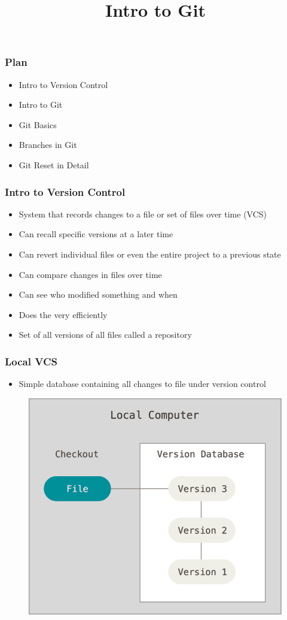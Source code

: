 \documentclass{beamer}
\title{Intro to Git}
\date{}
\begin{document}
\frame{\titlepage}

\begin{frame}
	\frametitle{Plan}
	\begin{itemize}
		\item{Intro to Version Control}
		\item{Intro to Git}
		\item{Git Basics}
		\item{Branches in Git}
		\item{Git Reset in Detail}
	\end{itemize}
\end{frame}

\begin{frame}
	\frametitle{Intro to Version Control}
	\begin{itemize}
		\item{System that records changes to a file or set of files over time (VCS)}
		\item{Can recall specific versions at a later time}
		\item{Can revert individual files or even the entire project to a previous state}
		\item{Can compare changes in files over time}
		\item{Can see who modified something and when}
		\item{Does the very efficiently}
		\item{Set of all versions of all files called a repository}
	\end{itemize}
\end{frame}

\begin{frame}
	\frametitle{Local VCS}
	\begin{itemize}
		\item{Simple database containing all changes to file under version control}
	\end{itemize}
	\begin{figure}
		\includegraphics[scale=0.25]{Local_VCS-0.png}
	\end{figure}
\end{frame}
\end{document}
